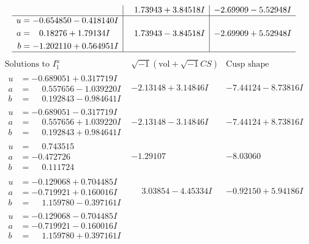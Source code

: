 \documentclass[1p]{elsarticle_modified}
\theoremstyle{definition}
\newcommand{\I}{\sqrt{-1}}
\begin{document}
$$\begin{array}{c|c|c}
 & \phantom{-}1.73943 + 3.84518 I & -2.69909 - 5.52948 I \\ \hline\begin{aligned}
u &= -0.654850 - 0.418140 I \\
a &= \phantom{-}0.18276 + 1.79134 I \\
b &= -1.202110 + 0.564951 I\end{aligned}
 & \phantom{-}1.73943 - 3.84518 I & -2.69909 + 5.52948 I\\
 \hline 
 \end{array}$$\newpage$$\begin{array}{c|c|c}  
\text{Solutions to }I^u_{1}& \I (\text{vol} + \sqrt{-1}CS) & \text{Cusp shape}\\
 \hline 
\begin{aligned}
u &= -0.689051 + 0.317719 I \\
a &= \phantom{-}0.557656 - 1.039220 I \\
b &= \phantom{-}0.192843 - 0.984641 I\end{aligned}
 & -2.13148 + 3.14846 I & -7.44124 - 8.73816 I \\ \hline\begin{aligned}
u &= -0.689051 - 0.317719 I \\
a &= \phantom{-}0.557656 + 1.039220 I \\
b &= \phantom{-}0.192843 + 0.984641 I\end{aligned}
 & -2.13148 - 3.14846 I & -7.44124 + 8.73816 I \\ \hline\begin{aligned}
u &= \phantom{-}0.743515\phantom{ +0.000000I} \\
a &= -0.472726\phantom{ +0.000000I} \\
b &= \phantom{-}0.111724\phantom{ +0.000000I}\end{aligned}
 & -1.29107\phantom{ +0.000000I} & -8.03060\phantom{ +0.000000I} \\ \hline\begin{aligned}
u &= -0.129068 + 0.704485 I \\
a &= -0.719921 + 0.160016 I \\
b &= \phantom{-}1.159780 - 0.397161 I\end{aligned}
 & \phantom{-}3.03854 - 4.45334 I & -0.92150 + 5.94186 I \\ \hline\begin{aligned}
u &= -0.129068 - 0.704485 I \\
a &= -0.719921 - 0.160016 I \\
b &= \phantom{-}1.159780 + 0.397161 I\end{aligned}

\end{array}$$
\end{document}
